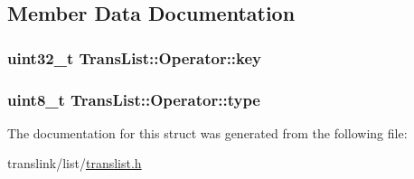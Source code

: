 \subsection{Member Data Documentation}
\hypertarget{structTransList_1_1Operator_a4dd818b67d2937304af998ab952868f6}{
\subsubsection[{key}]{\setlength{\rightskip}{0pt plus 5cm}uint32\-\_\-t Trans\-List\-::\-Operator\-::key}}\label{structTransList_1_1Operator_a4dd818b67d2937304af998ab952868f6}
\hypertarget{structTransList_1_1Operator_a146e148ecc1dc28194c660e5867bdd47}{
\subsubsection[{type}]{\setlength{\rightskip}{0pt plus 5cm}uint8\-\_\-t Trans\-List\-::\-Operator\-::type}}\label{structTransList_1_1Operator_a146e148ecc1dc28194c660e5867bdd47}


The documentation for this struct was generated from the following file\-:\begin{DoxyCompactItemize}
\item 
translink/list/\hyperlink{translist_8h}{translist.\-h}\end{DoxyCompactItemize}
